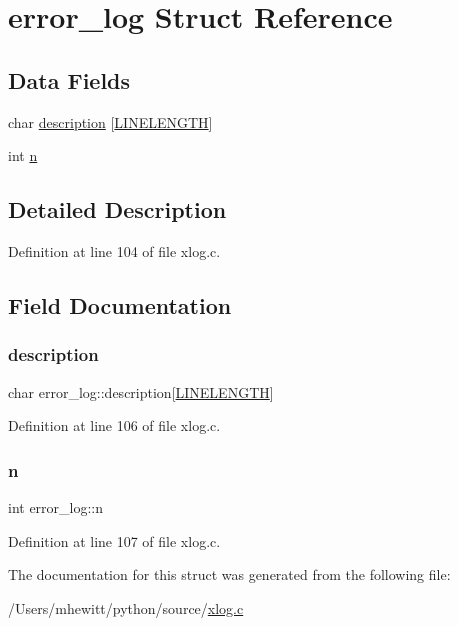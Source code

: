 \hypertarget{structerror__log}{}\section{error\+\_\+log Struct Reference}
\label{structerror__log}
\subsection*{Data Fields}
\begin{DoxyCompactItemize}
\item 
char \hyperlink{structerror__log_a16d5c133b827ebef42abc2fee9bbefb2}{description} \mbox{[}\hyperlink{xlog_8c_a10e8c7b8458375c3dbfbb4010a2aba8c}{L\+I\+N\+E\+L\+E\+N\+G\+TH}\mbox{]}
\item 
int \hyperlink{structerror__log_ac532eb6ea57c79987ee08e0081582d4e}{n}
\end{DoxyCompactItemize}


\subsection{Detailed Description}


Definition at line 104 of file xlog.\+c.



\subsection{Field Documentation}
\mbox{\label{structerror__log_a16d5c133b827ebef42abc2fee9bbefb2}} 
\subsubsection{\texorpdfstring{description}{description}}
{\footnotesize\ttfamily char error\+\_\+log\+::description\mbox{[}\hyperlink{xlog_8c_a10e8c7b8458375c3dbfbb4010a2aba8c}{L\+I\+N\+E\+L\+E\+N\+G\+TH}\mbox{]}}



Definition at line 106 of file xlog.\+c.

\mbox{\label{structerror__log_ac532eb6ea57c79987ee08e0081582d4e}} 
\subsubsection{\texorpdfstring{n}{n}}
{\footnotesize\ttfamily int error\+\_\+log\+::n}



Definition at line 107 of file xlog.\+c.



The documentation for this struct was generated from the following file\+:\begin{DoxyCompactItemize}
\item 
/\+Users/mhewitt/python/source/\hyperlink{xlog_8c}{xlog.\+c}\end{DoxyCompactItemize}
